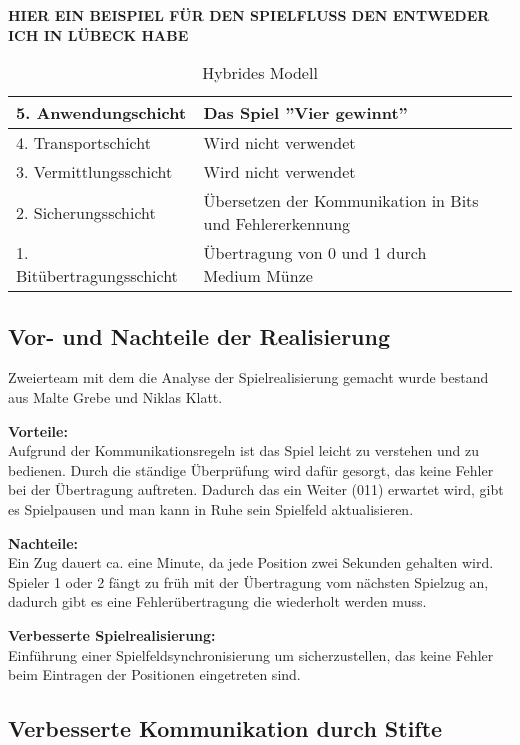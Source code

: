 \documentclass{scrartcl}
\begin{document}
  \textbf{HIER EIN BEISPIEL FÜR DEN SPIELFLUSS DEN ENTWEDER ICH IN LÜBECK HABE}
  
 \begin{table}
    \centering
    \caption{Hybrides Modell}
    \begin{tabular}{l|ll}
      5. Anwendungschicht & Das Spiel ''Vier gewinnt'' \\ \hline
      4. Transportschicht & Wird nicht verwendet \\ \hline
      3. Vermittlungsschicht & Wird nicht verwendet \\ \hline
      2. Sicherungsschicht & Übersetzen der Kommunikation in Bits und Fehlererkennung \\ \hline
      1. Bitübertragungsschicht & Übertragung von 0 und 1 durch Medium Münze\\ 
     \end{tabular}
\end{table}

 \subsection[Aufgabe 4 Vor- und Nachteile der Realisierung]{Vor- und Nachteile der Realisierung}

Zweierteam mit dem die Analyse der Spielrealisierung gemacht wurde bestand aus Malte Grebe und Niklas Klatt. 
 
 \textbf{Vorteile:}\\
 Aufgrund der Kommunikationsregeln ist das Spiel leicht zu verstehen und zu bedienen. Durch die ständige Überprüfung wird dafür gesorgt, das keine Fehler bei der Übertragung auftreten. Dadurch das ein Weiter (011) erwartet wird, gibt es Spielpausen und man kann in Ruhe sein Spielfeld aktualisieren. 
 
 \textbf{Nachteile:}\\
  Ein Zug dauert ca. eine Minute, da jede Position zwei Sekunden gehalten wird. Spieler 1 oder 2 fängt zu früh mit der Übertragung vom nächsten Spielzug an, dadurch gibt es eine Fehlerübertragung die wiederholt werden muss.
  
  \textbf{Verbesserte Spielrealisierung:}\\
  Einführung einer Spielfeldsynchronisierung um sicherzustellen, das keine Fehler beim Eintragen der Positionen eingetreten sind. 
  
  \subsection[Aufgabe 5 Verbesserte Kommunikation durch Stifte]{Verbesserte Kommunikation durch Stifte}
  
\end{document}
